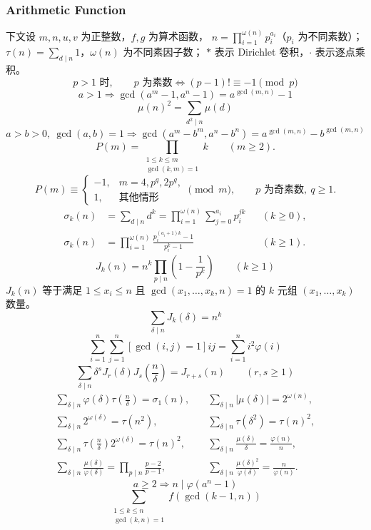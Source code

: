 \begin{footnotesize}
\subsubsection{Arithmetic Function}
下文设 $m,n,u,v$ 为正整数，$f,g$ 为算术函数，
$n=\prod_{i=1}^{\omega(n)}p_i^{a_i}$（$p_i$ 为不同素数）；
$\tau(n)=\sum_{d\mid n}1$，$\omega(n)$ 为不同素因子数；
$*$ 表示 Dirichlet 卷积，$\cdot$ 表示逐点乘积。
\[p>1\text{ 时},\qquad p\text{ 为素数}\Longleftrightarrow
    (p-1)!\equiv-1\pmod p\]
\[a>1\Rightarrow
    \gcd(a^m-1,a^n-1)=a^{\gcd(m,n)}-1\]
\[\mu(n)^2=\sum_{d^2\mid n}\mu(d)\]
\[a>b>0,\ \gcd(a,b)=1\Rightarrow
    \gcd(a^m-b^m,a^n-b^n)=a^{\gcd(m,n)}-b^{\gcd(m,n)}\]
\[
P(m)=\prod_{\substack{1\le k\le m\\\gcd(k,m)=1}}k\qquad(m\ge2).
\]
\[
P(m)\equiv
\begin{cases}
-1,&m=4,p^q,2p^q,\\
1,&\text{其他情形}
\end{cases}
\pmod m,\qquad p\text{ 为奇素数},\ q\ge1.
\]
\[
\begin{aligned}
\sigma_k(n)&=\sum_{d\mid n}d^k
    =\prod_{i=1}^{\omega(n)}\sum_{j=0}^{a_i}p_i^{jk}&& (k\ge0),\\
\sigma_k(n)&=\prod_{i=1}^{\omega(n)}
    \frac{p_i^{(a_i+1)k}-1}{p_i^k-1}&& (k\ge1).
\end{aligned}
\]
\[J_k(n)=n^k\prod_{p\mid n}\left(1-\frac1{p^k}\right)\qquad(k\ge1)\]
$J_k(n)$ 等于满足 $1\le x_i\le n$ 且
$\gcd(x_1,\ldots,x_k,n)=1$ 的 $k$ 元组 $(x_1,\ldots,x_k)$ 数量。
\[\sum_{\delta\mid n}J_k(\delta)=n^k\]
\[\sum_{i=1}^n\sum_{j=1}^n[\gcd(i,j)=1]ij
    =\sum_{i=1}^n i^2\varphi(i)\]
\[\sum_{\delta\mid n}\delta^sJ_r(\delta)J_s\left(\frac n\delta\right)
    =J_{r+s}(n)\qquad(r,s\ge1)\]
\begin{align*}
\sum_{\delta\mid n}\varphi(\delta)\tau\left(\frac n\delta\right)=\sigma_1(n),&\quad
\sum_{\delta\mid n}|\mu(\delta)|=2^{\omega(n)},\\
\sum_{\delta\mid n}2^{\omega(\delta)}=\tau(n^2),&\quad
\sum_{\delta\mid n}\tau(\delta^2)=\tau(n)^2,\\
\sum_{\delta\mid n}\tau\left(\frac n\delta\right)2^{\omega(\delta)}=\tau(n)^2,&\quad
\sum_{\delta\mid n}\frac{\mu(\delta)}\delta=\frac{\varphi(n)}n,\\
\sum_{\delta\mid n}\frac{\mu(\delta)}{\varphi(\delta)}
    =\prod_{p\mid n}\frac{p-2}{p-1},&\quad
\sum_{\delta\mid n}\frac{\mu(\delta)^2}{\varphi(\delta)}
    =\frac n{\varphi(n)}.
\end{align*}
\[a\ge2\Rightarrow n\mid\varphi(a^n-1)\]
\[\sum_{\substack{1\le k\le n\\\gcd(k,n)=1}}f(\gcd(k-1,n))
\]
\end{footnotesize}
